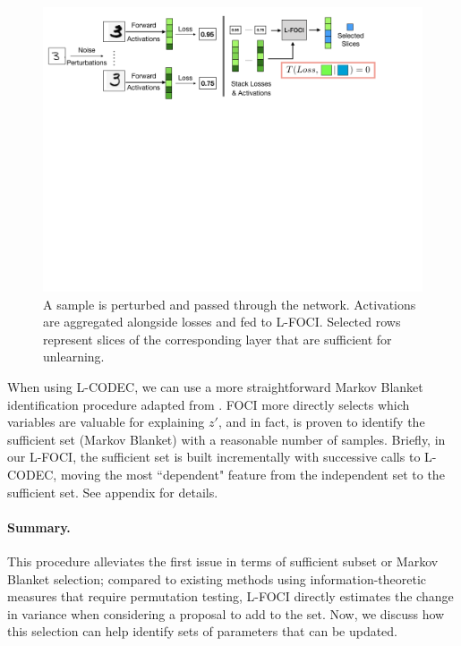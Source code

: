 \begin{figure}
    \centering
    \includegraphics[width=\columnwidth,trim={0 18cm 4cm 0},clip]{5_unlearn/figs/foci_fig_new.png}
    \caption{A sample is perturbed and passed through the network. Activations are aggregated alongside losses and fed to L-FOCI. Selected rows represent slices of the corresponding layer that are sufficient for unlearning.}
    \label{fig:lfoci}
\end{figure}

When using L-CODEC, we can use a more straightforward Markov Blanket identification procedure adapted from \cite{codec}. FOCI more directly selects which variables are valuable for explaining $z'$, and in fact, is proven to identify the sufficient set (Markov Blanket) with a reasonable number of samples. Briefly, in our L-FOCI, the sufficient set is built incrementally with successive calls to L-CODEC, moving the most ``dependent" feature from the independent set to the sufficient set.
See appendix for details.

\paragraph{Summary.} This procedure alleviates the first issue in terms of sufficient subset or Markov Blanket selection; compared to existing methods using information-theoretic measures that require permutation testing, L-FOCI directly estimates the change in variance when considering a proposal to add to the set.
Now, we discuss how this selection can help identify sets of parameters that can be updated.
